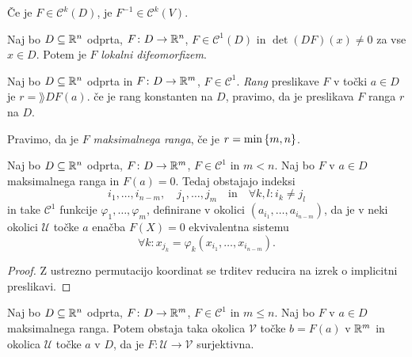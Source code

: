 \begin{opomba}
Če je $F \in \mathcal{C}^k(D)$, je $F^{-1} \in \mathcal{C}^k(V)$.
\end{opomba}

\begin{opomba}
Naj bo $D \subseteq \mathbb{R}^n$ odprta, $F \colon D \to \mathbb{R}^n$,
$F \in \mathcal{C}^1(D)$ in $\det(DF)(x) \ne 0$ za vse $x \in D$.
Potem je $F$ \emph{lokalni difeomorfizem}.
\end{opomba}


\begin{definicija}
Naj bo $D \subseteq \mathbb{R}^n$ odprta in $F \colon D \to \mathbb{R}^m$,
$F \in \mathcal{C}^1$. \emph{Rang}
preslikave $F$ v točki $a \in D$ je $r = \rang DF(a)$. če je rang
konstanten na $D$, pravimo, da je preslikava $F$ ranga $r$ na $D$.
\end{definicija}

\begin{opomba}
Pravimo, da je $F$ \emph{maksimalnega ranga}, če je
$r = \min\left\{m,n\right\}$. 
\end{opomba}

\begin{posledica}
Naj bo $D \subseteq \mathbb{R}^n$ odprta, $F \colon D \to \mathbb{R}^m$,
$F \in \mathcal{C}^1$ in $m < n$. Naj bo $F$ v $a \in D$
maksimalnega ranga in $F(a)=0$. Tedaj obstajajo indeksi
\[
i_1,\dots,i_{n-m}, \quad j_1,\dots,j_m \quad \text{in} \quad
\forall k,l \colon i_k \ne j_l
\]
in take $\mathcal{C}^1$ funkcije $\varphi_1,\dots,\varphi_m$,
definirane v okolici $(a_{i_1},\dots,a_{i_{n-m}})$, da je v neki
okolici $\mathcal{U}$ točke $a$ enačba $F(X)=0$ ekvivalentna
sistemu
\[
\forall k \colon x_{j_k} = \varphi_k(x_{i_1},\dots,x_{i_{n-m}}).
\]
\end{posledica}

\begin{proof}
Z ustrezno permutacijo koordinat se trditev reducira na izrek
o implicitni preslikavi.
\end{proof}

\begin{posledica}
Naj bo $D \subseteq \mathbb{R}^n$ odprta, $F \colon D \to \mathbb{R}^m$,
$F \in \mathcal{C}^1$ in $m \leq n$. Naj bo $F$ v $a \in D$
maksimalnega ranga. Potem obstaja taka okolica $\mathcal{V}$
točke $b = F(a)$ v $\mathbb{R}^m$ in okolica $\mathcal{U}$ točke $a$ v $D$,
da je $F \colon \mathcal{U} \to \mathcal{V}$ surjektivna.
\end{posledica}

